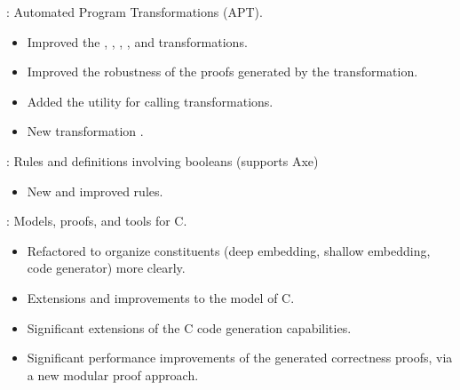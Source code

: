 \begin{frame}

\implibtitle

:
Automated Program Transformations (APT).
\begin{itemize}
\item Improved the , ,
  , , and
   transformations.
\item Improved the robustness of the proofs
  generated by the  transformation.
\item Added the  utility for calling transformations.
\item New transformation .
\end{itemize}

\end{frame}


\begin{frame}

\implibtitle

:
Rules and definitions involving booleans (supports Axe)
\begin{itemize}
\item New and improved rules.
\end{itemize}

\end{frame}


\begin{frame}

\implibtitle

:
Models, proofs, and tools for C.
\begin{itemize}
\item Refactored to organize constituents
      (deep embedding, shallow embedding, code generator)
      more clearly.
\item Extensions and improvements to the model of C.
\item Significant extensions of the C code generation capabilities.
\item Significant performance improvements of the generated correctness proofs,
      via a new modular proof approach.
\end{itemize}

\end{frame}


